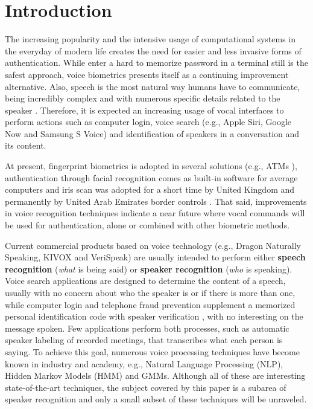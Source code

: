 \chapter{Introduction}
\label{ch:intro}

The increasing popularity and the intensive usage of computational systems in the everyday of modern life creates the need for easier and less invasive forms of authentication. While enter a hard to memorize password in a terminal still is the safest approach, voice biometrics presents itself as a continuing improvement alternative. Also, speech is the most natural way humans have to communicate, being incredibly complex and with numerous specific details related to the speaker \cite{bimbot.et.al.2004}. Therefore, it is expected an increasing usage of vocal interfaces to perform actions such as computer login, voice search (e.g., Apple Siri, Google Now and Samsung S Voice) and identification of speakers in a conversation and its content.

At present, fingerprint biometrics is adopted in several solutions (e.g., ATMs \cite{wang.wu.2002}), authentication through facial recognition comes as built-in software for average computers and iris scan was adopted for a short time by United Kingdom and permanently by United Arab Emirates border controls \cite{sasse.2007, raisi.khouri.2008}. That said, improvements in voice recognition techniques indicate a near future where vocal commands will be used for authentication, alone or combined with other biometric methods.

Current commercial products based on voice technology (e.g., Dragon Naturally Speaking, KIVOX and VeriSpeak) are usually intended to perform either \textbf{speech recognition} (\emph{what} is being said) or \textbf{speaker recognition} (\emph{who} is speaking). Voice search applications are designed to determine the content of a speech, usually with no concern about who the speaker is or if there is more than one, while computer login and telephone fraud prevention supplement a memorized personal identification code with speaker verification \cite{reynolds.1995}, with no interesting on the message spoken. Few applications perform both processes, such as automatic speaker labeling of recorded meetings, that transcribes what each person is saying. To achieve this goal, numerous voice processing techniques have become known in industry and academy, e.g., Natural Language Processing (NLP), Hidden Markov Models (HMM) and GMMs. Although all of these are interesting state-of-the-art techniques, the subject covered by this paper is a subarea of speaker recognition and only a small subset of these techniques will be unraveled.


